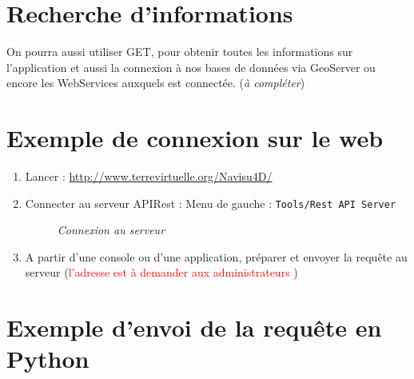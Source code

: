 \section{Recherche d'informations}
On pourra aussi utiliser GET, pour obtenir toutes les informations sur l'application et aussi la connexion à nos bases de données via GeoServer ou encore les WebServices auxquels \nav est connectée. ({\em à compléter})
\newpage

\section{Exemple de connexion sur le web}
\begin{enumerate}
\item Lancer \nav : \href{http://www.terrevirtuelle.org/Navisu4D/}{http://www.terrevirtuelle.org/Navisu4D/}
\item Connecter \nav au serveur APIRest : Menu de gauche : {\tt Tools/Rest API Server}
\begin{center}
\begin{figure}[ht]
\caption{\label{apiRest}\textit{Connexion au serveur}}
\end{figure}
\end{center}
\item A partir d'une console ou d'une application, préparer et envoyer la requête au serveur (\textcolor{red}{l'adresse est à demander aux administrateurs \nav})
\end{enumerate}

\section{Exemple d'envoi de la requête en Python}

